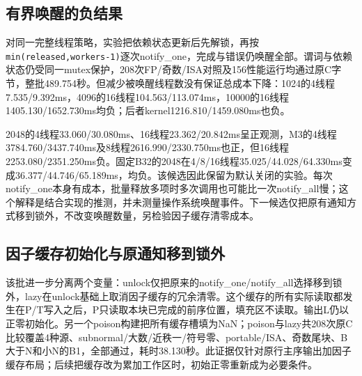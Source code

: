\documentclass[UTF8,a4paper,11pt]{ctexart}
\begin{document}
\subsection{有界唤醒的负结果}
对同一完整线程策略，实验把依赖状态更新后先解锁，再按\texttt{min(released,workers-1)}逐次notify\_one，完成与错误仍唤醒全部。谓词与依赖状态仍受同一mutex保护，208次FP/奇数/ISA对照及156性能运行均通过原C字节，整批489.754秒。但减少被唤醒线程数没有保证总成本下降：1024的4线程7.535/9.392ms，4096的16线程104.563/113.074ms，10000的16线程1405.130/1652.730ms均负；后者kernel1216.810/1459.080ms也负。

2048的4线程33.060/30.080ms、16线程23.362/20.842ms呈正观测，M3的4线程3784.760/3437.740ms及8线程2616.990/2330.750ms也正，但16线程2253.080/2351.250ms负。固定B32的2048在4/8/16线程35.025/44.028/64.330ms变成36.377/44.746/65.189ms，均负。该候选因此保留为默认关闭的实验。每次notify\_one本身有成本，批量释放多项时多次调用也可能比一次notify\_all慢；这个解释是结合实现的推测，并未测量操作系统唤醒事件。下一候选仅把原有通知方式移到锁外，不改变唤醒数量，另检验因子缓存清零成本。

\subsection{因子缓存初始化与原通知移到锁外}
该批进一步分离两个变量：unlock仅把原来的notify\_one/notify\_all选择移到锁外，lazy在unlock基础上取消因子缓存的冗余清零。这个缓存的所有实际读取都发生在P/T写入之后，P只读取本块已完成的前序位置，填充区不读取。输出L仍以正零初始化。另一个poison构建把所有缓存槽填为NaN；poison与lazy共208次原C比较覆盖4种源、subnormal/大数/近秩一/符号零、portable/ISA、奇数尾块、B大于N和小N的B1，全部通过，耗时38.130秒。此证据仅针对原行主序输出加因子缓存布局；后续把缓存改为累加工作区时，初始正零重新成为必要条件。
\end{document}
